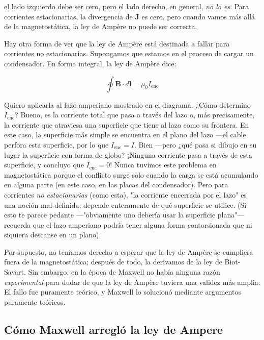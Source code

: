 \documentclass[12pt,a4paper]{report}
\begin{document}
	\noindent el lado izquierdo debe ser cero, pero el lado derecho, en general, \textit{no lo es}. Para corrientes estacionarias, la divergencia de $\mathbf{J}$ es cero, pero cuando vamos más allá de la magnetostática, la ley de Ampère no puede ser correcta.
	
	\vspace{0.4cm}
	\noindent Hay otra forma de ver que la ley de Ampère está destinada a fallar para corrientes no estacionarias. Supongamos que estamos en el proceso de cargar un condensador. En forma integral, la ley de Ampère dice:
	
	\begin{equation*}
		\oint \mathbf{B} \cdot d\mathbf{l} = \mu_0 I_{\text{enc}}
	\end{equation*}
	
	\noindent Quiero aplicarla al lazo amperiano mostrado en el diagrama. ¿Cómo determino $I_{\text{enc}}$? Bueno, es la corriente total que pasa a través del lazo o, más precisamente, la corriente que atraviesa una superficie que tiene al lazo como su frontera. En este caso, la superficie más simple se encuentra en el plano del lazo —el cable perfora esta superficie, por lo que $I_{\text{enc}} = I$. Bien —pero ¿qué pasa si dibujo en su lugar la superficie con forma de globo? ¡Ninguna corriente pasa a través de esta superficie, y concluyo que $I_{\text{enc}} = 0$! Nunca tuvimos este problema en magnetostática porque el conflicto surge solo cuando la carga se está acumulando en alguna parte (en este caso, en las placas del condensador). Pero para corrientes \textit{no estacionarias} (como esta), "la corriente encerrada por el lazo" es una noción mal definida; depende enteramente de qué superficie se utilice. (Si esto te parece pedante —"obviamente uno debería usar la superficie plana"— recuerda que el lazo amperiano podría tener alguna forma contorsionada que ni siquiera descanse en un plano).
	
	\vspace{0.3cm}
	
	Por supuesto, no teníamos derecho a esperar que la ley de Ampère se cumpliera fuera de la magnetostática; después de todo, la derivamos de la ley de Biot-Savart. Sin embargo, en la época de Maxwell no había ninguna razón \textit{experimental} para dudar de que la ley de Ampère tuviera una validez más amplia. El fallo fue puramente teórico, y Maxwell lo solucionó mediante argumentos puramente teóricos.
	
	\subsection{Cómo Maxwell arregló la ley de Ampere}
	
\end{document}

